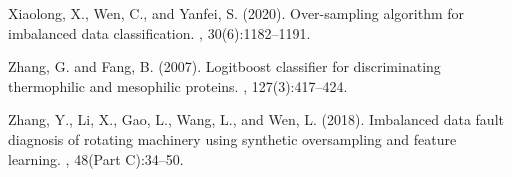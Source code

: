 \documentclass[runningheads]{llncs}
\begin{document}
\begin{thebibliography}{8}
  Xiaolong, X., Wen, C., and Yanfei, S. (2020).
  \newblock Over-sampling algorithm for imbalanced data classification.
  ,
    30(6):1182--1191.
  
  Zhang, G. and Fang, B. (2007).
  \newblock Logitboost classifier for discriminating thermophilic and mesophilic
    proteins.
  , 127(3):417--424.
  
  Zhang, Y., Li, X., Gao, L., Wang, L., and Wen, L. (2018).
  \newblock Imbalanced data fault diagnosis of rotating machinery using synthetic
    oversampling and feature learning.
  , 48(Part C):34--50.
\end{thebibliography}


%
\end{document}
